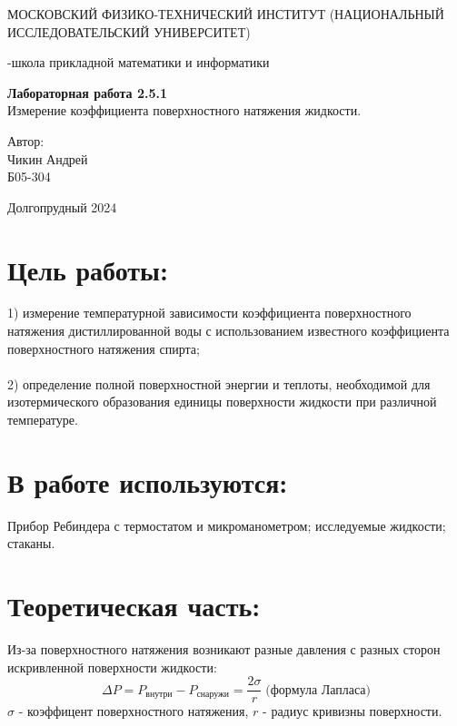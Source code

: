 \documentclass[a4paper,12pt]{article}
\begin{document}
\begin{titlepage}
    \begin{center}
        {\large МОСКОВСКИЙ ФИЗИКО-ТЕХНИЧЕСКИЙ ИНСТИТУТ (НАЦИОНАЛЬНЫЙ ИССЛЕДОВАТЕЛЬСКИЙ УНИВЕРСИТЕТ)}
    \end{center}
    \begin{center}
        {-школа прикладной математики и информатики}
    \end{center}

    \vspace{7cm}
    {\huge
        \begin{center}
            {\bf Лабораторная работа 2.5.1}\\
            Измерение коэффициента
            поверхностного натяжения жидкости.
        \end{center}
    }
    \vspace{2cm}
    \begin{flushright}
        {\LARGE Автор:\\ Чикин Андрей \\
            \vspace{0.2cm}
            Б05-304}
    \end{flushright}
    \vspace{3.5cm}
    \begin{center}
        Долгопрудный 2024
    \end{center}
\end{titlepage}

\large
\section{Цель работы:}
1) измерение температурной зависимости  коэффициента поверхностного натяжения дистиллированной воды с использованием известного коэффициента поверхностного натяжения спирта;
\\\\2) определение полной поверхностной энергии  и теплоты, необходимой для изотермического образования единицы  поверхности жидкости  при различной температуре.

\section{В работе используются:}
Прибор  Ребиндера  с термостатом и микроманометром; исследуемые жидкости; стаканы.

\section{Теоретическая часть:}
Из-за поверхностного натяжения возникают разные давления с разных сторон искривленной поверхности жидкости:
\begin{equation}
    \Delta P = P_\text{внутри} - P_\text{снаружи} = \frac{2\sigma}{r} \;\text{(формула Лапласа)}
\end{equation}
$\sigma$ - коэффицент поверхностного натяжения, $r$ - радиус кривизны поверхности.
\end{document}
